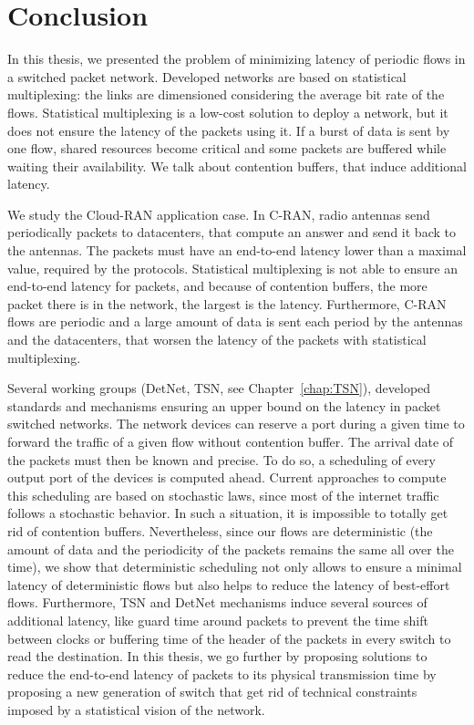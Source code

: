 
\chapter*{Conclusion}
\label{chap:concl}

In this thesis, we presented the problem of minimizing latency of periodic flows in a switched packet network. Developed networks are based on statistical multiplexing: the links are dimensioned considering the average bit rate of the flows. Statistical multiplexing is a low-cost solution to deploy a network, but it does not ensure the latency of the packets using it. If a burst of data is sent by one flow, shared resources become critical and some packets are buffered while waiting their availability. We talk about contention buffers, that induce additional latency.

We study the Cloud-RAN application case. In C-RAN, radio antennas send periodically packets to datacenters, that compute an answer and send it back to the antennas. The packets must have an end-to-end latency lower than a maximal value, required by the protocols. Statistical multiplexing is not able to ensure an end-to-end latency for packets, and because of contention buffers, the more packet there is in the network, the largest is the latency. Furthermore, C-RAN flows are periodic and a large amount of data is sent each period by the antennas and the datacenters, that worsen the latency of the packets with statistical multiplexing.

Several working groups (DetNet, TSN, see Chapter~\ref{chap:TSN}), developed standards and mechanisms ensuring an upper bound on the latency in packet switched networks. The network devices can reserve a port during a given time to forward the traffic of a given flow without contention buffer. The arrival date of the packets must then be known and precise. To do so, a scheduling of every output port of the devices is computed ahead. Current approaches to compute this scheduling are based on stochastic laws, since most of the internet traffic follows a stochastic behavior. In such a situation, it is impossible to totally get rid of contention buffers. Nevertheless, since our flows are deterministic (the amount of data and the periodicity of the packets remains the same all over the time), we show that deterministic scheduling not only allows to ensure a minimal latency of deterministic flows but also helps to reduce the latency of best-effort flows. 
Furthermore, TSN and DetNet mechanisms induce several sources of additional latency, like guard time around packets to prevent the time shift between clocks or buffering time of the header of the packets in every switch to read the destination. In this thesis, we go further by proposing solutions to reduce the end-to-end latency of packets to its physical transmission time by proposing a new generation of switch that get rid of technical constraints imposed by a statistical vision of the network.



